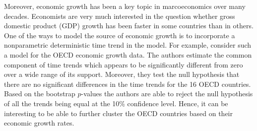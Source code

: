 \documentclass[a4paper,12pt]{article}
\begin{document}
\begin{example}
Moreover, economic growth has been a key topic in marcoeconomics over many decades. Economists are very much interested in the question whether gross domestic product (GDP) growth  has been faster in some countries than in others. One of the ways to model the source of economic growth is to incorporate a nonparametric deterministic time trend in the model. For example, \cite{Zhang2012} consider such a model for the OECD economic growth data.
The authors estimate the common component of time trends which appears to be significantly different from zero over a wide range of its support. Moreover, they test the null hypothesis that there are no significant differences in the time trends for the 16 OECD countries. Based on the bootstrap $p$-values the authors are able to reject the null hypothesis of all the trends being equal at the 10\% confidence level. Hence, it can be interesting to be able to further cluster the OECD countries based on their economic growth rates.
\end{example}
\end{document}
